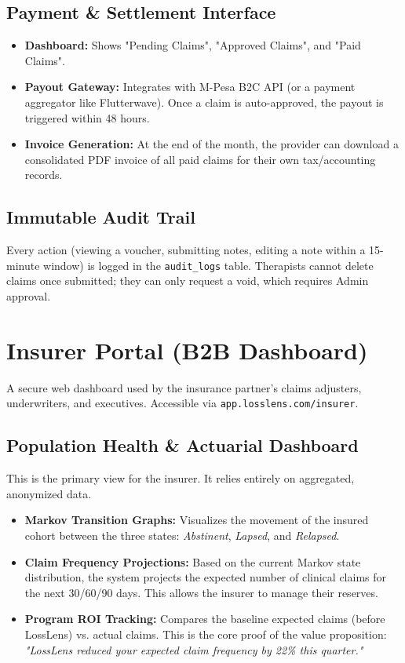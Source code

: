 \documentclass[11pt,a4paper]{article}
\begin{document}
\subsection{Payment \& Settlement Interface}
\begin{itemize}
    \item \textbf{Dashboard:} Shows "Pending Claims", "Approved Claims", and "Paid Claims".
    \item \textbf{Payout Gateway:} Integrates with M-Pesa B2C API (or a payment aggregator like Flutterwave). Once a claim is auto-approved, the payout is triggered within 48 hours.
    \item \textbf{Invoice Generation:} At the end of the month, the provider can download a consolidated PDF invoice of all paid claims for their own tax/accounting records.
\end{itemize}

\subsection{Immutable Audit Trail}
Every action (viewing a voucher, submitting notes, editing a note within a 15-minute window) is logged in the \texttt{audit\_logs} table. Therapists cannot delete claims once submitted; they can only request a void, which requires Admin approval.


\section{Insurer Portal (B2B Dashboard)}
A secure web dashboard used by the insurance partner's claims adjusters, underwriters, and executives. Accessible via \texttt{app.losslens.com/insurer}.

\subsection{Population Health \& Actuarial Dashboard}
This is the primary view for the insurer. It relies entirely on aggregated, anonymized data. 
\begin{itemize}
    \item \textbf{Markov Transition Graphs:} Visualizes the movement of the insured cohort between the three states: \textit{Abstinent}, \textit{Lapsed}, and \textit{Relapsed}.
    \item \textbf{Claim Frequency Projections:} Based on the current Markov state distribution, the system projects the expected number of clinical claims for the next 30/60/90 days. This allows the insurer to manage their reserves.
    \item \textbf{Program ROI Tracking:} Compares the baseline expected claims (before LossLens) vs. actual claims. This is the core proof of the value proposition: \textit{"LossLens reduced your expected claim frequency by 22\% this quarter."}
\end{itemize}
\end{document}

